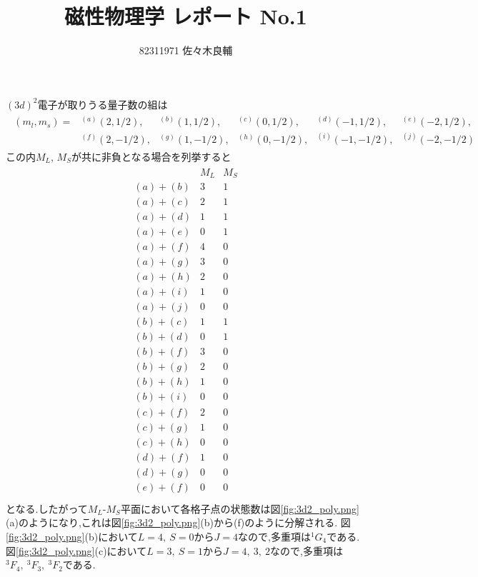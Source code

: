 \documentclass[uplatex,a4j,11pt,dvipdfmx]{jsarticle}
\begin{document}
\title{磁性物理学 レポート No.1}
\author{82311971 佐々木良輔}
\date{}
\maketitle
$(3d)^2$電子が取りうる量子数の組は
\begin{align}
  \begin{array}{llllll}
    (m_l,m_s)=&
    ^{(a)}(2,1/2),&
    ^{(b)}(1,1/2),&
    ^{(c)}(0,1/2),&
    ^{(d)}(-1,1/2),&
    ^{(e)}(-2,1/2),\\&
    ^{(f)}(2,-1/2),&
    ^{(g)}(1,-1/2),&
    ^{(h)}(0,-1/2),&
    ^{(i)}(-1,-1/2),&
    ^{(j)}(-2,-1/2)
  \end{array}
\end{align}
この内$M_L$, $M_S$が共に非負となる場合を列挙すると
\begin{align}
  \begin{array}{c|cc}
    &M_L&M_S\\
    \hline
    (a)+(b)&3&1\\
    (a)+(c)&2&1\\
    (a)+(d)&1&1\\
    (a)+(e)&0&1\\
    (a)+(f)&4&0\\
    (a)+(g)&3&0\\
    (a)+(h)&2&0\\
    (a)+(i)&1&0\\
    (a)+(j)&0&0\\
    (b)+(c)&1&1\\
    (b)+(d)&0&1\\
    (b)+(f)&3&0\\
    (b)+(g)&2&0\\
    (b)+(h)&1&0\\
    (b)+(i)&0&0\\
    (c)+(f)&2&0\\
    (c)+(g)&1&0\\
    (c)+(h)&0&0\\
    (d)+(f)&1&0\\
    (d)+(g)&0&0\\
    (e)+(f)&0&0\\
  \end{array}
\end{align}
となる.したがって$M_L$-$M_S$平面において各格子点の状態数は図\ref{fig:3d2_poly.png}(a)のようになり,これは図\ref{fig:3d2_poly.png}(b)から(f)のように分解される.
図\ref{fig:3d2_poly.png}(b)において$L=4,\ S=0$から$J=4$なので,多重項は$^1G_4$である.
図\ref{fig:3d2_poly.png}(c)において$L=3,\ S=1$から$J=4,\ 3,\ 2$なので,多重項は$^3F_4,\ ^3F_3,\ ^3F_2$である.
\end{document}
